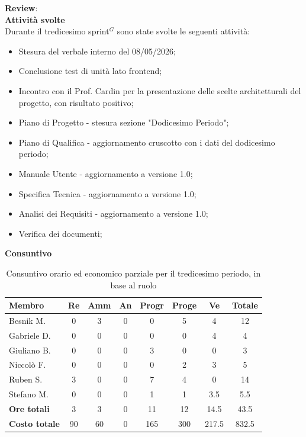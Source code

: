 \documentclass[a4paper,10pt]{article}
\begin{document}
\textbf{Review}: \\
\textbf{Attività svolte}\\
Durante il tredicesimo sprint$^G$ sono state svolte le seguenti attività:
\begin{itemize}
  \item Stesura del verbale interno del 08/05/2026;
  \item Conclusione test di unità lato frontend;
  \item Incontro con il Prof. Cardin per la presentazione delle scelte architetturali del progetto, con risultato positivo;
  \item Piano di Progetto - stesura sezione "Dodicesimo Periodo";
  \item Piano di Qualifica - aggiornamento cruscotto con i dati del dodicesimo periodo;
  \item Manuale Utente - aggiornamento a versione 1.0;
  \item Specifica Tecnica - aggiornamento a versione 1.0;
  \item Analisi dei Requisiti - aggiornamento a versione 1.0;
  \item Verifica dei documenti;
\end{itemize}
\textbf{Consuntivo}
\begin{table}[H]
  \centering
  \begin{tabular}{|l|c|c|c|c|c|c|c|}
    \hline
    \textbf{Membro} & \textbf{Re} & \textbf{Amm} & \textbf{An} & \textbf{Progr} & \textbf{Proge} & \textbf{Ve} & \textbf{Totale} \\
    \hline
    Besnik M.   & 0 & 3 & 0 & 0   & 5 & 4   & 12  \\
    Gabriele D. & 0 & 0 & 0 & 0   & 0 & 4   & 4  \\
    Giuliano B. & 0 & 0 & 0 & 3   & 0 & 0   & 3  \\
    Niccolò F.  & 0 & 0 & 0 & 0   & 2 & 3   & 5  \\
    Ruben S.    & 3 & 0 & 0 & 7   & 4 & 0   & 14 \\
    Stefano M.  & 0 & 0 & 0 & 1   & 1 & 3.5   & 5.5  \\
    \hline
    \textbf{Ore totali} & 3  & 3 & 0 & 11  & 12 & 14.5 & 43.5 \\
    \hline
    \textbf{Costo totale} & 90 & 60 & 0 & 165  & 300  & 217.5 & 832.5 \\
    \hline
  \end{tabular}
  \caption{Consuntivo orario ed economico parziale per il tredicesimo periodo, in base al ruolo}
\end{table}
\end{document}
